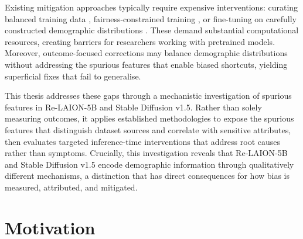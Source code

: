 Existing mitigation approaches typically require expensive interventions: curating balanced
training data \cite{Yang_2020_FairerDatasets}, fairness-constrained training
\cite{Zhang_2018_MitigatingUnwantedBiasesAdversarial}, or fine-tuning on carefully
constructed demographic distributions \cite{Friedrich_2023_FairDiffusionInstructingTextToImage}.
These demand substantial computational resources, creating barriers for researchers working
with pretrained models. Moreover, outcome-focused corrections may balance demographic
distributions without addressing the spurious features that enable biased shortcuts, yielding
superficial fixes that fail to generalise.

This thesis addresses these gaps through a mechanistic investigation of spurious features in
Re-LAION-5B and Stable Diffusion v1.5. Rather than solely measuring outcomes, it applies
established methodologies to expose the spurious features that distinguish dataset sources
and correlate with sensitive attributes, then evaluates targeted inference‐time interventions that address root causes rather than symptoms. Crucially, this investigation reveals that Re‐LAION‐5B and Stable Diffusion v1.5 encode demographic information through qualitatively different mechanisms, a distinction that has direct consequences for how bias is measured, attributed, and mitigated.

\section{Motivation}

